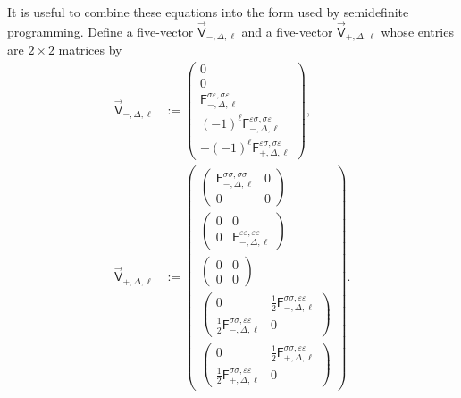 It is useful to combine these equations into the form used by
semidefinite programming.  Define a five-vector
\(\vec{\mathsf V}_{-,\Delta,\ell}\) and a five-vector
\(\vec{\mathsf V}_{+,\Delta,\ell}\) whose entries are \(2\times2\) matrices by
\begin{align}
  \vec{\mathsf V}_{-,\Delta,\ell}
  &:=
  \begin{pmatrix}
    0\\
    0\\
    \mathsf F_{-,\Delta,\ell}^{\sigma\varepsilon,\sigma\varepsilon}\\
    (-1)^\ell
    \mathsf F_{-,\Delta,\ell}^{\varepsilon\sigma,\sigma\varepsilon}\\
    -(-1)^\ell
    \mathsf F_{+,\Delta,\ell}^{\varepsilon\sigma,\sigma\varepsilon}
  \end{pmatrix},
  \label{eq:ising-mixed-vminus}
  \\
  \vec{\mathsf V}_{+,\Delta,\ell}
  &:=
  \begin{pmatrix}
    \begin{pmatrix}
      \mathsf F_{-,\Delta,\ell}^{\sigma\sigma,\sigma\sigma} & 0\\
      0 & 0
    \end{pmatrix}\\[1.0em]
    \begin{pmatrix}
      0 & 0\\
      0 & \mathsf F_{-,\Delta,\ell}^{\varepsilon\varepsilon,\varepsilon\varepsilon}
    \end{pmatrix}\\[1.0em]
    \begin{pmatrix}
      0 & 0\\
      0 & 0
    \end{pmatrix}\\[1.0em]
    \begin{pmatrix}
      0 & \frac12\mathsf F_{-,\Delta,\ell}^{\sigma\sigma,\varepsilon\varepsilon}\\
      \frac12\mathsf F_{-,\Delta,\ell}^{\sigma\sigma,\varepsilon\varepsilon} & 0
    \end{pmatrix}\\[1.0em]
    \begin{pmatrix}
      0 & \frac12\mathsf F_{+,\Delta,\ell}^{\sigma\sigma,\varepsilon\varepsilon}\\
      \frac12\mathsf F_{+,\Delta,\ell}^{\sigma\sigma,\varepsilon\varepsilon} & 0
    \end{pmatrix}
  \end{pmatrix}.
  \label{eq:ising-mixed-vplus}
\end{align}

